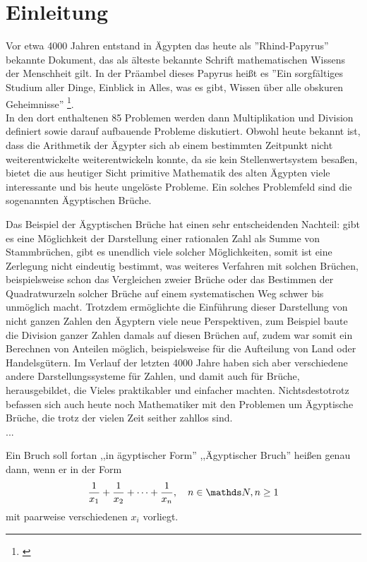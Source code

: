 \section{Einleitung}\label{sec:arithmetic}
Vor etwa 4000 Jahren entstand in Ägypten das heute als ''Rhind-Papyrus'' bekannte Dokument, das als älteste bekannte Schrift mathematischen Wissens der Menschheit gilt. In der Präambel dieses Papyrus heißt es ''Ein sorgfältiges Studium aller Dinge, Einblick in Alles, was es gibt, Wissen über alle obskuren Geheimnisse'' \footnote{\cite[S. 37, Übersetzung durch den Autor]{Burton2011}}.\\ In den dort enthaltenen 85 Problemen werden dann Multiplikation und Division definiert sowie darauf aufbauende Probleme diskutiert. Obwohl heute bekannt ist, dass die Arithmetik der Ägypter sich ab einem bestimmten Zeitpunkt nicht weiterentwickelte \bzw weiterentwickeln konnte, da sie  kein Stellenwertsystem besaßen, bietet die aus heutiger Sicht primitive Mathematik des alten Ägypten viele interessante und bis heute ungelöste Probleme. Ein solches Problemfeld sind die sogenannten Ägyptischen Brüche.

Das Beispiel der Ägyptischen Brüche hat einen sehr entscheidenden Nachteil: gibt es eine Möglichkeit der Darstellung einer rationalen Zahl als Summe von Stammbrüchen, gibt es unendlich viele solcher Möglichkeiten, somit ist eine Zerlegung nicht eindeutig bestimmt, was weiteres Verfahren mit solchen Brüchen, beispielsweise schon das Vergleichen zweier Brüche oder das Bestimmen der Quadratwurzeln solcher Brüche auf einem systematischen Weg schwer bis unmöglich macht. \cite[S.62]{Resnikoff1984} Trotzdem ermöglichte die Einführung dieser Darstellung von nicht ganzen Zahlen den Ägyptern viele neue Perspektiven, zum Beispiel baute die Division ganzer Zahlen damals auf diesen Brüchen auf, zudem war somit ein Berechnen von Anteilen möglich, beispielsweise für die Aufteilung von Land oder Handelsgütern. Im Verlauf der letzten 4000 Jahre haben sich aber verschiedene andere Darstellungssysteme für Zahlen, und damit auch für Brüche, herausgebildet, die Vieles praktikabler und einfacher machten. Nichtsdestotrotz befassen sich auch heute noch Mathematiker mit den Problemen um Ägyptische Brüche, die trotz der vielen Zeit seither zahllos sind.
\\...

\begin{def1}\label{def:egypfrac}
	Ein Bruch soll fortan ,,in ägyptischer Form'' \bzw  ,,Ägyptischer Bruch'' heißen genau dann, wenn er in der Form
	$$\uf{x_1} + \uf{x_2} + \cdots + \uf{x_n}, \quad n \in \N, n \ge 1$$
	mit paarweise verschiedenen $x_i$ vorliegt.
\end{def1}


